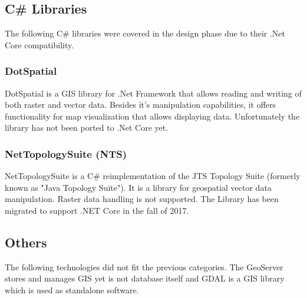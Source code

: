 \subsection{C\# Libraries}
The following C\# libraries were covered in the design phase due to their .Net Core compatibility.

\subsubsection{DotSpatial}
DotSpatial is a GIS library for .Net Framework that allows reading and writing of both raster and vector data. Besides it's manipulation capabilities, it offers functionality for map visualization that allows displaying data. Unfortunately the library has not been ported to .Net Core yet.

\subsubsection{NetTopologySuite (NTS)}
NetTopologySuite is a C\# reimplementation of the JTS Topology Suite (formerly known as "Java Topology Suite"). It is a library for geospatial vector data manipulation. Raster data handling is not supported. The Library has been migrated to support .NET Core in the fall of 2017.


\subsection{Others}
The following technologies did not fit the previous categories. The GeoServer stores and manages GIS yet is not database itself and GDAL is a GIS library which is used as standalone software.

